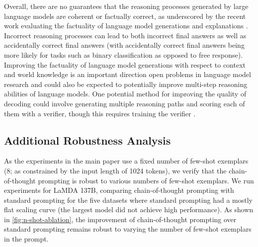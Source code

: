 \documentclass[]{article}
\theoremstyle{plain}
\theoremstyle{definition}
\theoremstyle{remark}
\newcommand{\orange}[1]{#1}
\newcommand{\lamda}[0]{LaMDA}
\begin{document}
\orange{Overall, there are no guarantees that the reasoning processes generated by large language models are coherent or factually correct, as underscored by the recent work evaluating the factuality of language model generations and explanations \citep{maynez-etal-2020-faithfulness,rashkin2021measuring,ye2022unreliability,marasovic2021few,wiegreffe2021reframing}. Incorrect reasoning processes can lead to both incorrect final answers as well as accidentally correct final answers (with accidentally correct final answers being more likely for tasks such as binary classification as opposed to free response). Improving the factuality of language model generations with respect to context and world knowledge is an important direction open problems in language model research and could also be expected to potentially improve multi-step reasoning abilities of language models. One potential method for improving the quality of decoding could involve generating multiple reasoning paths and scoring each of them with a verifier, though this requires training the verifier \citep{cobbe2021training,shen-etal-2021-generate-rank,thoppilan2022lamda}.}

\subsection{Additional Robustness Analysis}\label{subsec:additional-robustness}
As the experiments in the main paper use a fixed number of few-shot exemplars (8; as constrained by the input length of 1024 tokens), we verify that the chain-of-thought prompting is robust to various numbers of few-shot exemplars. 
We run experiments for \lamda{} 137B, comparing chain-of-thought prompting with standard prompting for the five datasets where standard prompting had a mostly flat scaling curve (the largest model did not achieve high performance). 
As shown in \cref{fig:n-shot-ablation}, the improvement of chain-of-thought prompting over standard prompting remains robust to varying the number of few-shot exemplars in the prompt.
\end{document}

